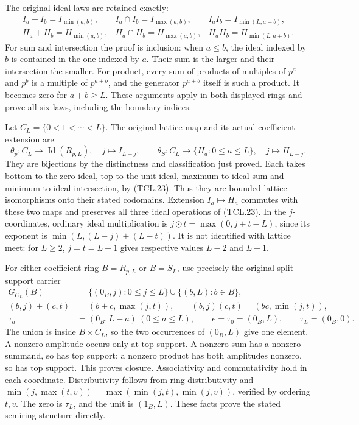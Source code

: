 The original ideal laws are retained exactly:
\[
 \begin{array}{lll}
 I_a+I_b=I_{\min(a,b)},& I_a\cap I_b=I_{\max(a,b)},&
              I_a I_b=I_{\min(L,a+b)},\\
 H_a+H_b=H_{\min(a,b)},& H_a\cap H_b=H_{\max(a,b)},&
              H_a H_b=H_{\min(L,a+b)}.
 \end{array}
 \tag{TCL.23}\label{CFStage:eq:tcl-ideal-laws}
\]
For sum and intersection the proof is inclusion: when \(a\leq b\),
the ideal indexed by \(b\) is contained in the one indexed by
\(a\). Their sum is the larger and their intersection the smaller.
For product, every sum of products of multiples of \(p^a\) and
\(p^b\) is a multiple of \(p^{a+b}\), and the generator
\(p^{a+b}\) itself is such a product. It becomes zero for
\(a+b\geq L\). These arguments apply in both displayed rings
and prove all six laws, including the boundary indices.

Let \(C_L=\{0<1<\cdots<L\}\). The original lattice map and its
actual coefficient extension are
\[
 \theta_p:C_L\longrightarrow\operatorname{Id}(R_{p,L}),
       \quad j\longmapsto I_{L-j},\qquad
 \theta_S:C_L\longrightarrow\{H_a:0\leq a\leq L\},
       \quad j\longmapsto H_{L-j}.
 \tag{TCL.24}\label{CFStage:eq:tcl-theta}
\]
They are bijections by the distinctness and classification just
proved. Each takes bottom to the zero ideal, top to the unit ideal,
maximum to ideal sum and minimum to ideal intersection, by
(TCL.23). Thus they are bounded-lattice isomorphisms onto their
stated codomains. Extension \(I_a\mapsto H_a\) commutes with
these two maps and preserves all three ideal operations of
(TCL.23). In the \(j\)-coordinates, ordinary ideal multiplication
is \(j\mathbin{\odot}t=\max(0,j+t-L)\), since its exponent is
\(\min(L,(L-j)+(L-t))\). It is not identified with lattice
meet: for \(L\geq2\), \(j=t=L-1\) gives respective values
\(L-2\) and \(L-1\).

For either coefficient ring \(B=R_{p,L}\) or \(B=S_L\), use
precisely the original split-support carrier
\[
 \begin{split}
 G_{C_L}(B)&=\{(0_B,j):0\leq j\leq L\}
                 \cup\{(b,L):b\in B\},\\
 (b,j)+(c,t)&=(b+c,\max(j,t)),\qquad
 (b,j)(c,t)=(bc,\min(j,t)),\\
 \tau_a&=(0_B,L-a)\ (0\leq a\leq L),\qquad
 e=\tau_0=(0_B,L),\qquad \tau_L=(0_B,0).
 \end{split}
 \tag{TCL.25}\label{CFStage:eq:tcl-carrier}
\]
The union is inside \(B\times C_L\), so the two occurrences
of \((0_B,L)\) give one element. A nonzero amplitude occurs only
at top support. A nonzero sum has a nonzero summand, so has top
support; a nonzero product has both amplitudes nonzero, so has
top support. This proves closure. Associativity and commutativity
hold in each coordinate. Distributivity follows from ring
distributivity and \(\min(j,\max(t,v))
=\max(\min(j,t),\min(j,v))\), verified by ordering \(t,v\).
The zero is \(\tau_L\), and the unit is \((1_B,L)\).
These facts prove the stated semiring structure directly.

